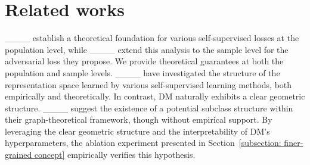 \section{Related works}
\label{subsection: related works}
____ establish a theoretical foundation for various self-supervised losses at the population level, while ____ extend this analysis to the sample level for the adversarial loss they propose. We provide theoretical guarantees at both the population and sample levels. ____ have investigated the structure of the representation space learned by various self-supervised learning methods, both empirically and theoretically. In contrast, DM naturally exhibits a clear geometric structure. ____ suggest the existence of a potential subclass structure within their graph-theoretical framework, though without empirical support. By leveraging the clear geometric structure and the interpretability of DM's hyperparameters, the ablation experiment presented in Section~\ref{subsection: finer-grained concept} empirically verifies this hypothesis.